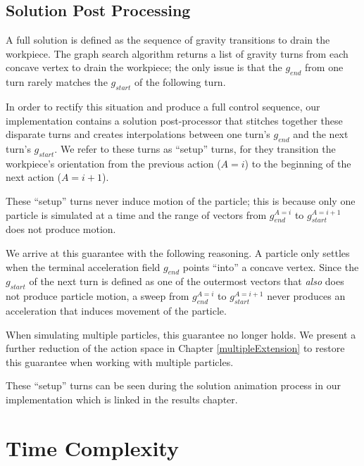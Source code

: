 	\subsection{Solution Post Processing}

A full solution is defined as the sequence of gravity transitions to drain the workpiece. The graph search algorithm returns a list of gravity turns from each concave vertex to drain the workpiece; the only issue is that the $g_{end}$ from one turn rarely matches the $g_{start}$ of the following turn.

In order to rectify this situation and produce a full control sequence, our implementation contains a solution post-processor that stitches together these disparate turns and creates interpolations between one turn's $g_{end}$ and the next turn's $g_{start}$. We refer to these turns as ``setup'' turns, for they transition the workpiece's orientation from the previous action ($A=i$) to the beginning of the next action ($A=i + 1$).

These ``setup'' turns never induce motion of the particle; this is because only one particle is simulated at a time and the range of vectors from $g_{end}^{A=i}$ to $g_{start}^{A=i + 1}$ does not produce motion.

We arrive at this guarantee with the following reasoning. A particle only settles when the terminal acceleration field $g_{end}$ points ``into'' a concave vertex. Since the $g_{start}$ of the next turn is defined as one of the outermost vectors that \emph{also} does not produce particle motion, a sweep from $g_{end}^{A=i}$ to $g_{start}^{A=i + 1}$ never produces an acceleration that induces movement of the particle.

When simulating multiple particles, this guarantee no longer holds. We present a further reduction of the action space in Chapter \ref{multipleExtension} to restore this guarantee when working with multiple particles.


These ``setup'' turns can be seen during the solution animation process in our implementation which is linked in the results chapter.


  \section{Time Complexity}

